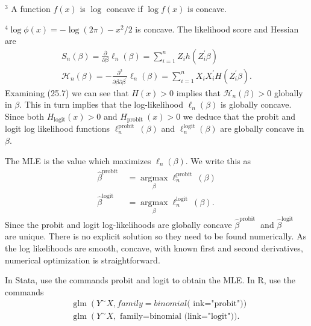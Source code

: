 \documentclass[10pt]{article}
\begin{document}
${ }^{3}$ A function $f(x)$ is $\log$ concave if $\log f(x)$ is concave.

${ }^{4} \log \phi(x)=-\log (2 \pi)-x^{2} / 2$ is concave. The likelihood score and Hessian are
$$
\begin{gathered}
S_{n}(\beta)=\frac{\partial}{\partial \beta} \ell_{n}(\beta)=\sum_{i=1}^{n} Z_{i} h\left(Z_{i}^{\prime} \beta\right) \\
\mathscr{H}_{n}(\beta)=-\frac{\partial^{2}}{\partial \beta \partial \beta^{\prime}} \ell_{n}(\beta)=\sum_{i=1}^{n} X_{i} X_{i}^{\prime} H\left(Z_{i}^{\prime} \beta\right) .
\end{gathered}
$$
Examining (25.7) we can see that $H(x)>0$ implies that $\mathscr{H}_{n}(\beta)>0$ globally in $\beta$. This in turn implies that the log-likelihood $\ell_{n}(\beta)$ is globally concave. Since both $H_{\operatorname{logit}}(x)>0$ and $H_{\text {probit }}(x)>0$ we deduce that the probit and logit log likelihood functions $\ell_{n}^{\text {probit }}(\beta)$ and $\ell_{n}^{\operatorname{logit}}(\beta)$ are globally concave in $\beta$.

The MLE is the value which maximizes $\ell_{n}(\beta)$. We write this as
$$
\begin{aligned}
\widehat{\beta}^{\text {probit }} &=\underset{\beta}{\operatorname{argmax}} \ell_{n}^{\text {probit }}(\beta) \\
\widehat{\beta}^{\text {logit }} &=\underset{\beta}{\operatorname{argmax}} \ell_{n}^{\text {logit }}(\beta) .
\end{aligned}
$$
Since the probit and logit log-likelihoods are globally concave $\widehat{\beta}^{\text {probit }}$ and $\widehat{\beta}^{\text {logit }}$ are unique. There is no explicit solution so they need to be found numerically. As the log likelihoods are smooth, concave, with known first and second derivatives, numerical optimization is straightforward.

In Stata, use the commands probit and logit to obtain the MLE. In R, use the commands
$$
\begin{aligned}
&\operatorname{glm}\left(Y^{\sim} X, f a m i l y=b i n o m i a l(\text { ink="probit")) }\right. \\
&\operatorname{glm}\left(Y^{\sim} X,\right. \text { family=binomial (link="logit")). }
\end{aligned}
$$
\end{document}
